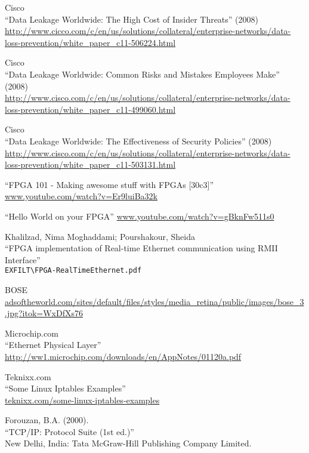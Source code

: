 \documentclass[dvipdfm]{book}
\begin{document}
\begin{thebibliography}{99}
 Cisco \\
``Data Leakage Worldwide: The High Cost of Insider Threats'' (2008)\\
\url{http://www.cicco.com/c/en/us/solutions/collateral/enterprise-networks/data-loss-prevention/white_paper_c11-506224.html}

 Cisco\\
``Data Leakage Worldwide: Common Risks and Mistakes Employees Make'' (2008)\\
\url{http://www.cisco.com/c/en/us/solutions/collateral/enterprise-networks/data-loss-prevention/white_paper_c11-499060.html}

 Cisco\\
``Data Leakage Worldwide: The Effectiveness of Security Policies'' (2008)\\
\url{http://www.cisco.com/c/en/us/solutions/collateral/enterprise-networks/data-loss-prevention/white_paper_c11-503131.html}

 ``FPGA 101 - Making awesome stuff with FPGAs [30c3]''\\
\url{www.youtube.com/watch?v=Er9luiBa32k}

 ``Hello World on your FPGA''
\url{www.youtube.com/watch?v=gBknFw511s0}

 Khalilzad, Nima Moghaddami; Pourshakour, Sheida\\
``FPGA implementation of Real-time Ethernet communication using RMII Interface''\\
\verb|EXFILT\FPGA-RealTimeEthernet.pdf|

 BOSE\\
\url{adsoftheworld.com/sites/default/files/styles/media_retina/public/images/bose_3.jpg?itok=WxDfXs76}

 Microchip.com\\
``Ethernet Physical Layer''\\
\url{http://ww1.microchip.com/downloads/en/AppNotes/01120a.pdf}

 Teknixx.com\\
``Some Linux Iptables Examples''\\
\url{teknixx.com/some-linux-iptables-examples}

 Forouzan, B.A. (2000).\\
``TCP/IP: Protocol Suite (1st ed.)''\\
New Delhi, India: Tata McGraw-Hill Publishing Company Limited.


\end{thebibliography}
\end{document}
